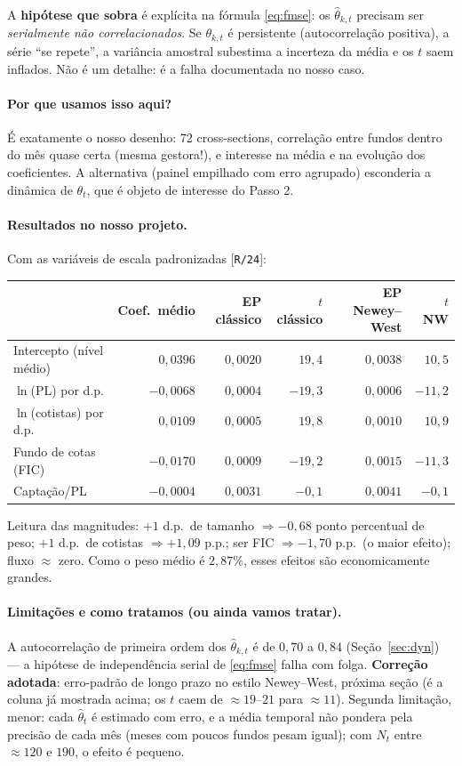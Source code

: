 \documentclass[11pt,a4paper]{article}
\newcommand{\porque}[0]{\paragraph{Por que usamos isso aqui?}}
\newcommand{\resultados}[0]{\paragraph{Resultados no nosso projeto.}}
\newcommand{\limitacoes}[0]{\paragraph{Limitações e como tratamos (ou ainda vamos tratar).}}
\newcommand{\scriptref}[1]{{\footnotesize\color{cinza}[\texttt{#1}]}}
\begin{document}
A \textbf{hipótese que sobra} é explícita na fórmula \eqref{eq:fmse}: os $\widehat\theta_{k,t}$
precisam ser \emph{serialmente não correlacionados}. Se $\theta_{k,t}$ é persistente
(autocorrelação positiva), a série ``se repete'', a variância amostral subestima a incerteza da
média e os $t$ saem inflados. Não é um detalhe: é a falha documentada no nosso caso.

\porque É exatamente o nosso desenho: 72 cross-sections, correlação entre fundos dentro do mês
quase certa (mesma gestora!), e interesse na média e na evolução dos coeficientes. A alternativa
(painel empilhado com erro agrupado) esconderia a dinâmica de $\theta_t$, que é objeto de
interesse do Passo 2.

\resultados Com as variáveis de escala padronizadas \scriptref{R/24}:

\begin{center}\small
\begin{tabular}{@{}lrrrrr@{}}
\toprule
 & Coef.\ médio & EP clássico & $t$ clássico & EP Newey--West & $t$ NW \\
\midrule
Intercepto (nível médio) & $0{,}0396$ & $0{,}0020$ & $19{,}4$ & $0{,}0038$ & $10{,}5$ \\
$\ln$(PL) por d.p. & $-0{,}0068$ & $0{,}0004$ & $-19{,}3$ & $0{,}0006$ & $-11{,}2$ \\
$\ln$(cotistas) por d.p. & $0{,}0109$ & $0{,}0005$ & $19{,}8$ & $0{,}0010$ & $10{,}9$ \\
Fundo de cotas (FIC) & $-0{,}0170$ & $0{,}0009$ & $-19{,}2$ & $0{,}0015$ & $-11{,}3$ \\
Captação/PL & $-0{,}0004$ & $0{,}0031$ & $-0{,}1$ & $0{,}0041$ & $-0{,}1$ \\
\bottomrule
\end{tabular}
\end{center}

Leitura das magnitudes: $+1$ d.p.\ de tamanho $\Rightarrow-0{,}68$ ponto percentual de peso; $+1$
d.p.\ de cotistas $\Rightarrow+1{,}09$ p.p.; ser FIC $\Rightarrow-1{,}70$ p.p.\ (o maior efeito);
fluxo $\approx$ zero. Como o peso médio é $2{,}87\%$, esses efeitos são economicamente grandes.

\limitacoes A autocorrelação de primeira ordem dos $\widehat\theta_{k,t}$ é de $0{,}70$ a $0{,}84$
(Seção~\ref{sec:dyn}) --- a hipótese de independência serial de \eqref{eq:fmse} falha com folga.
\textbf{Correção adotada}: erro-padrão de longo prazo no estilo Newey--West, próxima seção (é a
coluna já mostrada acima; os $t$ caem de $\approx19$--$21$ para $\approx11$). Segunda limitação,
menor: cada $\widehat\theta_t$ é estimado com erro, e a média temporal não pondera pela precisão
de cada mês (meses com poucos fundos pesam igual); com $N_t$ entre $\approx120$ e $190$, o efeito
é pequeno.
\end{document}
